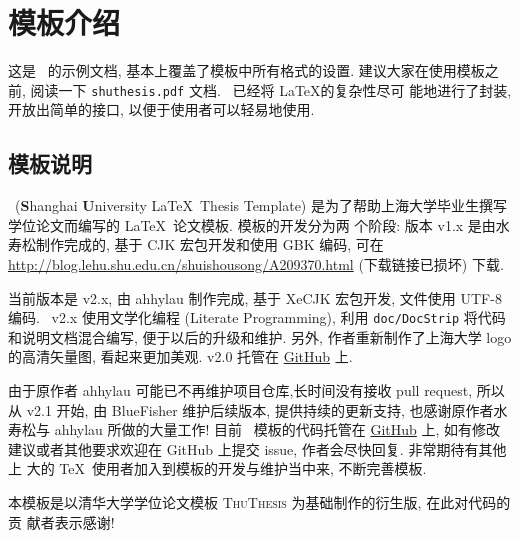 \chapter{模板介绍}
\label{cha:intro}

这是 \shuthesis\ 的示例文档, 基本上覆盖了模板中所有格式的设置. 建议大家在使用模板之
前, 阅读一下 \texttt{shuthesis.pdf} 文档. \shuthesis\ 已经将 \LaTeX 的复杂性尽可
能地进行了封装, 开放出简单的接口, 以便于使用者可以轻易地使用.
 
\section{模板说明}
\shuthesis\ (\textbf{S}hanghai \textbf{U}niversity \LaTeX\ Thesis Template) 
是为了帮助上海大学毕业生撰写学位论文而编写的 \LaTeX\ 论文模板. 模板的开发分为两
个阶段: 版本 v1.x 是由水寿松制作完成的, 基于 CJK 宏包开发和使用 GBK 编码, 可在
\url{http://blog.lehu.shu.edu.cn/shuishousong/A209370.html} (下载链接已损坏) 下载. 

当前版本是 v2.x, 由 ahhylau 制作完成, 基于 XeCJK 宏包开发, 文件使用 UTF-8 编码. 
\shuthesis\ v2.x 使用文学化编程 (Literate Programming), 利用 \texttt{doc/DocStrip} 
将代码和说明文档混合编写, 便于以后的升级和维护. 另外, 作者重新制作了上海大学 
logo 的高清矢量图, 看起来更加美观. v2.0 托管在 \href{https://github.com/ahhylau/shuthesis}{GitHub} 上.

由于原作者 ahhylau 可能已不再维护项目仓库,长时间没有接收 pull request, 所以从 v2.1 开始, 由
BlueFisher 维护后续版本, 提供持续的更新支持, 也感谢原作者水寿松与 ahhylau 所做的大量工作!
目前 \shuthesis\ 模板的代码托管在 \href{https://github.com/BlueFisher/shuthesis}{GitHub} 
上, 如有修改建议或者其他要求欢迎在 GitHub 上提交 issue, 作者会尽快回复. 非常期待有其他上
大的 \TeX\ 使用者加入到模板的开发与维护当中来, 不断完善模板.

本模板是以清华大学学位论文模板 \textsc{ThuThesis} 为基础制作的衍生版, 在此对代码的贡
献者表示感谢!


